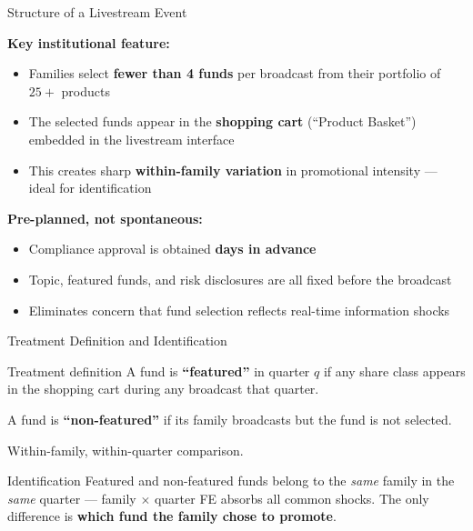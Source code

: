 \documentclass[11pt, aspectratio=169]{beamer}
\newcommand{\hl}[1]{\textcolor{myblue}{\textbf{#1}}}
\begin{document}

\begin{frame}{Structure of a Livestream Event}

\textbf{Key institutional feature:}
\begin{itemize}
  \item Families select \hl{fewer than 4 funds} per broadcast
  from their portfolio of $25+$ products
  \item The selected funds appear in the \hl{shopping cart}
  (``Product Basket'') embedded in the livestream interface
  \item This creates sharp \hl{within-family variation} in
  promotional intensity --- ideal for identification
\end{itemize}

\vspace{0.35cm}
\textbf{Pre-planned, not spontaneous:}
\begin{itemize}
  \item Compliance approval is obtained \hl{days in advance}
  \item Topic, featured funds, and risk disclosures are
  all fixed before the broadcast
  \item Eliminates concern that fund selection reflects
  real-time information shocks
\end{itemize}

\end{frame}


\begin{frame}{Treatment Definition and Identification}

\begin{block}{Treatment definition}
  A fund is \hl{``featured''} in quarter $q$ if any share class
  appears in the shopping cart during any broadcast that quarter.

  \medskip
  A fund is \hl{``non-featured''} if its family broadcasts
  but the fund is not selected.

  \medskip
  Within-family, within-quarter comparison.
\end{block}

\vspace{0.4cm}
\begin{alertblock}{Identification}
  Featured and non-featured funds belong to the \emph{same}
  family in the \emph{same} quarter --- family $\times$ quarter
  FE absorbs all common shocks. The only difference is
  \hl{which fund the family chose to promote}.
\end{alertblock}

\end{frame}
\end{document}
